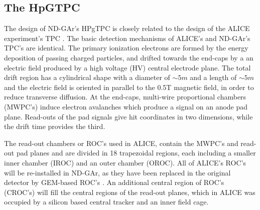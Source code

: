 \subsection{The HpGTPC}
The design of ND-GAr's HPgTPC is closely related to the design of the ALICE experiment's TPC \cite{ALICE}. The basic detection mechanisms of ALICE's and ND-GAr's TPC's are identical. The primary ionization electrons are formed by the energy deposition of passing charged particles, and drifted towards the end-caps by a an electric field produced by a high voltage (HV) central electrode plane. The total drift region has a cylindrical shape with a diameter of $\sim 5m$ and a length of $\sim 5m$ and the electric field is oriented in parallel to the 0.5T magnetic field, in order to reduce transverse diffusion. At the end-caps, multi-wire proportional chambers (MWPC's) induce electron avalanches which produce a signal on an anode pad plane. Read-outs of the pad signals give hit coordinates in two dimensions, while the drift time provides the third.

The read-out chambers or ROC's used in ALICE, contain the MWPC's and read-out pad planes and are divided in 18 trapezoidal regions, each including a smaller inner chamber (IROC) and an outer chamber (OROC). All of ALICE's ROC's will be re-installed in ND-GAr, as they have been replaced in the original detector by GEM-based ROC's \cite{Ferretti:2022yjd}. An additional central region of ROC's (CROC's) will fill the central regions of the read-out planes, which in ALICE was occupied by a silicon based central tracker and an inner field cage. 

